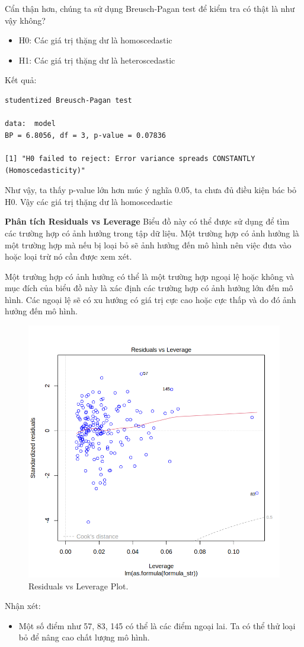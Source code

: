 Cẩn thận hơn, chúng ta sử dụng Breusch-Pagan test để kiểm tra có thật là như vậy không?
\begin{itemize}
    \item H0: Các giá trị thặng dư là homoscedastic
    \item H1: Các giá trị thặng dư là heteroscedastic
\end{itemize}
Kết quả:
\begin{lstlisting}
studentized Breusch-Pagan test

data:  model
BP = 6.8056, df = 3, p-value = 0.07836

[1] "H0 failed to reject: Error variance spreads CONSTANTLY (Homoscedasticity)"
\end{lstlisting}

Như vậy, ta thấy p-value lớn hơn múc ý nghĩa 0.05, ta chưa đủ điều kiện bác bỏ H0. Vậy các giá trị thặng dư là homoscedastic

\textbf{Phân tích Residuals vs Leverage} Biểu đồ này có thể được sử dụng để tìm các trường hợp có ảnh hưởng trong tập dữ liệu. Một trường hợp có ảnh hưởng là một trường hợp mà nếu bị loại bỏ sẽ ảnh hưởng đến mô hình nên việc đưa vào hoặc loại trừ nó cần được xem xét.

Một trường hợp có ảnh hưởng có thể là một trường hợp ngoại lệ hoặc không và mục đích của biểu đồ này là xác định các trường hợp có ảnh hưởng lớn đến mô hình. Các ngoại lệ sẽ có xu hướng có giá trị cực cao hoặc cực thấp và do đó ảnh hưởng đến mô hình.

\begin{figure}[H]
    \centering
    \includegraphics[width=0.75\columnwidth]{csm_figures/best_csm_model_residual_leverage.png}
    \caption{Residuals vs Leverage Plot.}
    \label{fig:best_csm_model_residual_leverage}
\end{figure}
Nhận xét:
\begin{itemize}
    \item Một số điểm như 57, 83, 145 có thể là các điểm ngoại lai. Ta có thể thử loại bỏ để nâng cao chất lượng mô hình.
\end{itemize}

